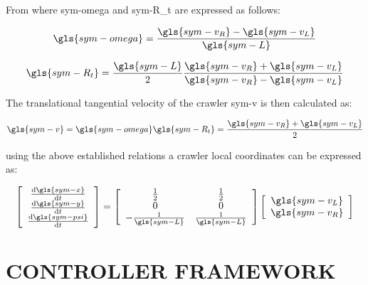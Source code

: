 \noindent From where \gls{sym-omega} and \gls{sym-R_t} are expressed as follows:

\begin{equation}
    \label{eq:omega_t}
    \gls{sym-omega} = \frac{\gls{sym-v_R} - \gls{sym-v_L}}{\gls{sym-L}}
\end{equation}

\begin{equation}
    \label{eq:R_t}
    \gls{sym-R_t} = \frac{\gls{sym-L}}{2}\frac{\gls{sym-v_R} + \gls{sym-v_L}}{\gls{sym-v_R} - \gls{sym-v_L}}
\end{equation}

\noindent The translational tangential velocity of the crawler \gls{sym-v} is then calculated as:

\begin{equation}
    \label{eq:v_crawler}
    \gls{sym-v} = \gls{sym-omega} \gls{sym-R_t} = \frac{\gls{sym-v_R} + \gls{sym-v_L}}{2}
\end{equation}

\noindent using the above established relations a crawler local coordinates can be expressed as:

\begin{equation}
    \label{eq:local_frame}
    \left[\begin{array}{c}
              \dv{\gls{sym-x}}{t} \\
              \dv{\gls{sym-y}}{t} \\
              \dv{\gls{sym-psi}}{t}
    \end{array}\right] = \left[\begin{array}{cc}
                                   \frac{1}{2}            & \frac{1}{2}           \\
                                   0                      & 0                     \\
                                   -\frac{1}{\gls{sym-L}} & \frac{1}{\gls{sym-L}}
    \end{array}\right] \left[\begin{array}{c}
                                 \gls{sym-v_L} \\
                                 \gls{sym-v_R}
    \end{array}\right]
\end{equation}


\section{CONTROLLER FRAMEWORK}\label{sec:controller}


